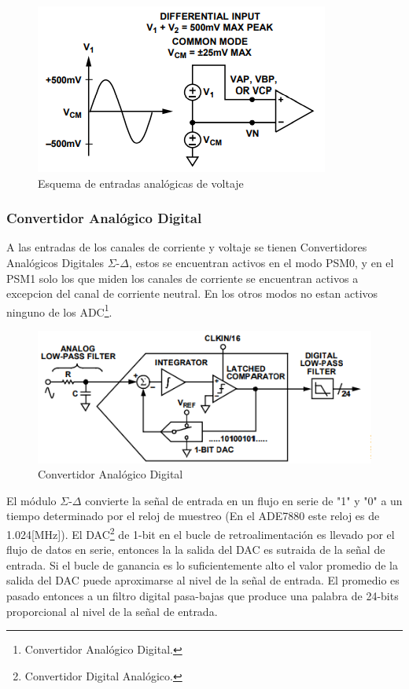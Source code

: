 \documentclass[letterpaper,12pt,oneside]{book}
\begin{document}
				\begin{figure}[!htpb]
					\centering
					\includegraphics[scale = 1.0]{Material de Consulta/EntAnVlt.PNG}
					\caption[Entradas analógicas de Voltaje]{Esquema de entradas analógicas de voltaje}
					\label{EntVolt}
				\end{figure}

				\subsubsection{Convertidor Analógico Digital}
				A las entradas de los canales de corriente y voltaje se tienen Convertidores Analógicos Digitales $\Sigma$-$\Delta$, estos se encuentran activos en el modo PSM0, y en el PSM1 solo los que miden los canales de corriente se encuentran activos a excepcion del canal de corriente neutral. En los otros modos no estan activos ninguno de los ADC\footnote{Convertidor Analógico Digital.}.

				\begin{figure}[!htpb]
					\centering
					\includegraphics[scale = 1.0]{Material de Consulta/ADC_SigDel.PNG}
					\caption[Convertidor Analógico Digital]{Convertidor Analógico Digital}
					\label{ADCSigDel}
				\end{figure}

				El módulo $\Sigma$-$\Delta$ convierte la señal de entrada en un flujo en serie de "1" y "0" a un tiempo determinado por el reloj de muestreo (En el ADE7880 este reloj es de 1.024[MHz]). El DAC\footnote{Convertidor Digital Analógico.} de 1-bit en el bucle de retroalimentación es llevado por el flujo de datos en serie, entonces la la salida del DAC es sutraida de la señal de entrada. Si el bucle de ganancia es lo suficientemente alto el valor promedio de la salida del DAC puede aproximarse al nivel de la señal de entrada. El promedio es pasado entonces a un filtro digital pasa-bajas que produce una palabra de 24-bits proporcional al nivel de la señal de entrada.
\end{document}
